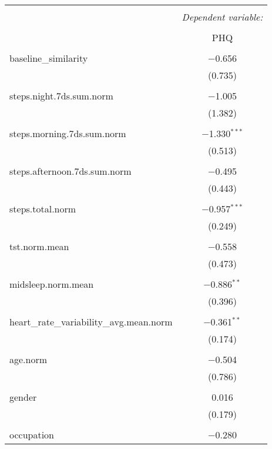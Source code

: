 
\begin{table}[!htbp] \centering 
  \caption{} 
  \label{} 
\begin{tabular}{@{\extracolsep{5pt}}lc} 
\\[-1.8ex]\hline 
\hline \\[-1.8ex] 
 & \multicolumn{1}{c}{\textit{Dependent variable:}} \\ 
\cline{2-2} 
\\[-1.8ex] & PHQ \\ 
\hline \\[-1.8ex] 
 baseline\_similarity & $-$0.656 \\ 
  & (0.735) \\ 
  & \\ 
 steps.night.7ds.sum.norm & $-$1.005 \\ 
  & (1.382) \\ 
  & \\ 
 steps.morning.7ds.sum.norm & $-$1.330$^{***}$ \\ 
  & (0.513) \\ 
  & \\ 
 steps.afternoon.7ds.sum.norm & $-$0.495 \\ 
  & (0.443) \\ 
  & \\ 
 steps.total.norm & $-$0.957$^{***}$ \\ 
  & (0.249) \\ 
  & \\ 
 tst.norm.mean & $-$0.558 \\ 
  & (0.473) \\ 
  & \\ 
 midsleep.norm.mean & $-$0.886$^{**}$ \\ 
  & (0.396) \\ 
  & \\ 
 heart\_rate\_variability\_avg.mean.norm & $-$0.361$^{**}$ \\ 
  & (0.174) \\ 
  & \\ 
 age.norm & $-$0.504 \\ 
  & (0.786) \\ 
  & \\ 
 gender & 0.016 \\ 
  & (0.179) \\ 
  & \\ 
 occupation & $-$0.280 \\ 

\end{tabular}
\end{table}
